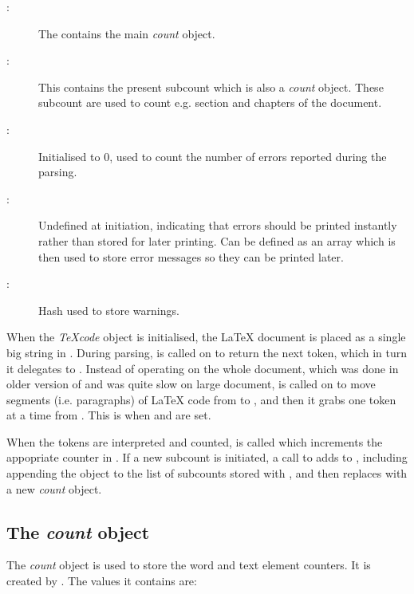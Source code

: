 \documentclass{article}
\newcommand\Obj[1]{\textsl{#1}}
\begin{document}
\begin{description}
\item[:] The contains the main \Obj{count} object.

\item[:] This contains the present subcount which is also a \Obj{count} object. These subcount are used to count e.g. section and chapters of the document.

\item[:] Initialised to 0, used to count the number of errors reported during the parsing.

\item[:] Undefined at initiation, indicating that errors should be printed instantly rather than stored for later printing. Can be defined as an array which is then used to store error messages so they can be printed later. 

\item[:] Hash used to store warnings.

\end{description}

When the \Obj{TeXcode} object is initialised, the \LaTeX{} document is placed as a single big string in . During parsing,  is called on to return the next token, which in turn it delegates to . Instead of operating on the whole document, which was done in older version of \TeXcount{} and was quite slow on large document,  is called on to move segments (i.e. paragraphs) of \LaTeX{} code from  to , and then it grabs one token at a time from . This is when  and  are set.

When the tokens are interpreted and counted,  is called which increments the appopriate counter in . If a new subcount is initiated, a call to  adds  to , including appending the  object to the list of subcounts stored with , and then replaces  with a new \Obj{count} object. 


\subsection{The \Obj{count} object}

The \Obj{count} object is used to store the word and text element counters. It is created by . The values it contains are:
\end{document}
